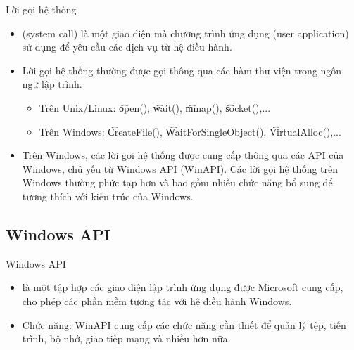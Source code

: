 \begin{frame}{Lời gọi hệ thống}
    \begin{itemize}
        \item {} (system call) là một giao diện mà chương trình ứng dụng (user application) sử dụng để yêu cầu các dịch vụ từ hệ điều hành.
        \item Lời gọi hệ thống thường được gọi thông qua các hàm thư viện trong ngôn ngữ lập trình.\\
        \vspace{10 pt}
        \begin{itemize}
            \item Trên Unix/Linux: \t{open()}, \t{wait()}, \t{mmap()}, \t{socket()},...
            \item Trên Windows: \t{CreateFile()}, \t{WaitForSingleObject()}, \t{VirtualAlloc()},...
        \end{itemize}
        \item Trên Windows, các lời gọi hệ thống được cung cấp thông qua các API của Windows, chủ yếu từ Windows API (WinAPI). Các lời gọi hệ thống trên Windows thường phức tạp hơn và bao gồm nhiều chức năng bổ sung để tương thích với kiến trúc của Windows. 
    \end{itemize}
\end{frame}

\subsection{Windows API}
\begin{frame}{Windows API}
\begin{itemize}
    \item {} là một tập hợp các giao diện lập trình ứng dụng được Microsoft cung cấp, cho phép các phần mềm tương tác với hệ điều hành Windows.
    \item \underline{Chức năng:} WinAPI cung cấp các chức năng cần thiết để quản lý tệp, tiến trình, bộ nhớ, giao tiếp mạng và nhiều hơn nữa.
\end{itemize}

\end{frame}

